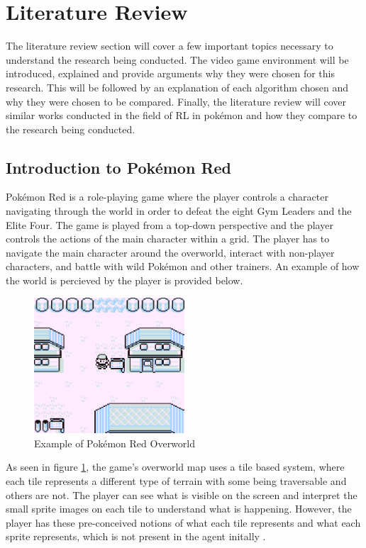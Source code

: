 \section{Literature Review}

The literature review section will cover a few important topics necessary to understand the research being conducted. The video game environment will be introduced, explained and provide arguments why they were chosen for this research. This will be followed by an explanation of each algorithm chosen and why they were chosen to be compared. Finally, the literature review will cover similar works conducted in the field of RL in pokémon and how they compare to the research being conducted.

\subsection{Introduction to Pokémon Red}

Pokémon Red is a role-playing game where the player controls a character navigating through the world in order to defeat the eight Gym Leaders and the Elite Four. The game is played from a top-down perspective and the player controls the actions of the main character within a grid. The player has to navigate the main character around the overworld, interact with non-player characters, and battle with wild Pokémon and other trainers. An example of how the world is percieved by the player is provided below\cite{HubZ_1998}. 

\begin{figure}[H]
    \centering
    \includegraphics[width=0.5\textwidth]{figures/red_pallet_town.png}
    \caption{Example of Pokémon Red Overworld}
    \label{fig:pkmn_overworld}
\end{figure}

As seen in figure \ref{fig:pkmn_overworld}, the game's overworld map uses a tile based system, where each tile represents a different type of terrain with some being traversable and others are not. The player can see what is visible on the screen and interpret the small sprite images on each tile to understand what is happening. However, the player has these pre-conceived notions of what each tile represents and what each sprite represents, which is not present in the agent initally \cite{HubZ_1998}. 

